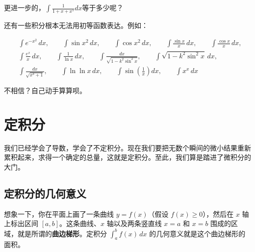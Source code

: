 更进一步的，\(\int \frac{1}{1+x+x^5}dx\)等于多少呢？

还有一些积分根本无法用初等函数表达。例如：

\[
\begin{aligned}
&\int e^{-x^2}\,dx,\qquad \int \sin x^2\,dx,\qquad \int \cos x^2\,dx,\qquad \int \frac{\sin x}{x}\,dx,\qquad \int \frac{\cos x}{x}\,dx,\\
&\int \frac{e^x}{x}\,dx,\qquad \int \frac{1}{\ln x}\,dx,\qquad \int \frac{dx}{\sqrt{1-k^2\sin^2 x}},\qquad \int \sqrt{1-k^2\sin^2 x}\,dx,\\
&\int \frac{dx}{\sqrt{x^3+1}},\qquad \int \ln \ln x\,dx,\qquad \int \sin\!(\frac{1}{x})dx,\qquad \int x^x\,dx
\end{aligned}
\]

不相信？自己动手算算呗。

\section{定积分}
我们已经学会了导数，学会了不定积分。现在我们要把无数个瞬间的微小结果重新累积起来，求得一个确定的总量，这就是定积分。至此，我们算是踏进了微积分的大门。

\subsection{定积分的几何意义}

想象一下，你在平面上画了一条曲线 $y = f(x)$（假设 $f(x) \geq 0$），然后在 $x$ 轴上标出区间 $[a, b]$。这条曲线、$x$ 轴以及两条竖直线 $x = a$ 和 $x = b$ 围成的区域，就是所谓的\textbf{曲边梯形}。定积分 $\int_a^b f(x)\,dx$ 的几何意义就是这个曲边梯形的面积。

